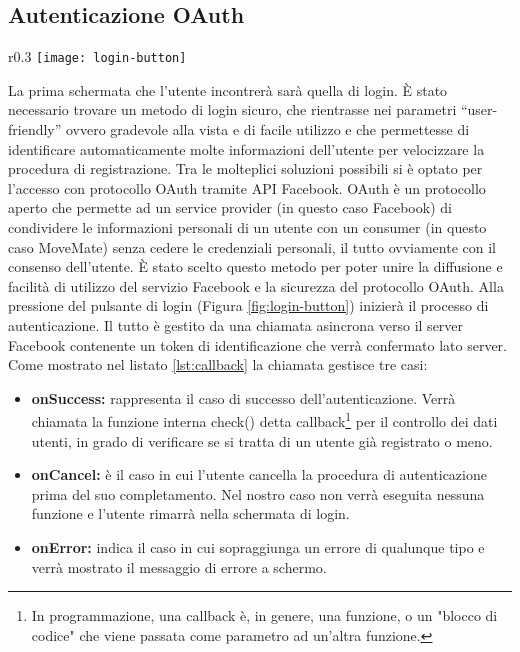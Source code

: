 \subsection{Autenticazione OAuth}

\begin{wrapfigure}{r}{0.3\textwidth}
\texttt{[image: login-button]}
\caption{Sezione schermata login}
\label{fig:login-button}
\end{wrapfigure} 
\FloatBarrier

La prima schermata che l'utente incontrerà sarà quella di login.
È stato necessario trovare un metodo di login sicuro, che rientrasse nei parametri “user-friendly” ovvero gradevole alla vista e di facile utilizzo e che permettesse di identificare automaticamente molte informazioni dell’utente per velocizzare la procedura di registrazione. Tra le molteplici soluzioni possibili si è optato per l’accesso con protocollo OAuth tramite API Facebook.
OAuth è un protocollo aperto che permette ad un service provider (in questo caso Facebook) di condividere le informazioni personali di un utente con un consumer (in questo caso MoveMate) senza cedere le credenziali personali, il tutto ovviamente con il consenso dell'utente. È stato scelto questo metodo per poter unire la diffusione e facilità di utilizzo del servizio Facebook e la sicurezza del protocollo OAuth.
Alla pressione del pulsante di login (Figura \ref{fig:login-button}) inizierà il processo di autenticazione. Il tutto è gestito da una chiamata asincrona verso il server Facebook contenente un token di identificazione che verrà confermato lato server. Come mostrato nel listato \ref{lst:callback} la chiamata gestisce tre casi:

\begin{itemize}
\item \textbf{onSuccess:} rappresenta il caso di successo dell'autenticazione. Verrà chiamata la funzione interna check() detta callback\footnote{In programmazione, una callback è, in genere, una funzione, o un "blocco di codice" che viene passata come parametro ad un'altra funzione.} per il controllo dei dati utenti, in grado di verificare se si tratta di un utente già registrato o meno.
\item \textbf{onCancel:} è il caso in cui l'utente cancella la procedura di autenticazione prima del suo completamento. Nel nostro caso non verrà eseguita nessuna funzione e l'utente rimarrà nella schermata di login.
\item \textbf{onError:} indica il caso in cui sopraggiunga un errore di qualunque tipo e verrà mostrato il messaggio di errore a schermo.
\end{itemize}

